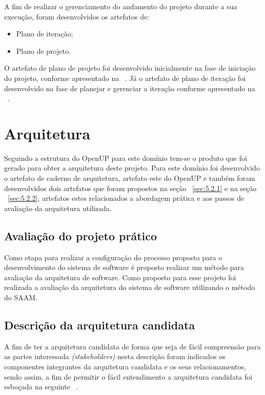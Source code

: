 A fim de realizar o gerenciamento do andamento do projeto durante a sua execução, foram desenvolvidos os artefatos de: 
\begin{itemize}
    \item Plano de iteração;
    \item Plano de projeto.
\end{itemize}

O artefato de plano de projeto foi desenvolvido inicialmente na fase de iniciação do projeto, conforme apresentado na ~. Já o artefato de plano de iteração foi desenvolvido na fase de planejar e gerenciar a iteração conforme apresentado na ~.
\section{Arquitetura}
\label{sec:arquitetura}

Seguindo a estrutura do \acrfull{OpenUP} para este domínio tem-se  o produto que foi gerado para obter a arquitetura deste projeto. Para este domínio foi desenvolvido o artefato de caderno de arquitetura, artefato este do \acrfull{OpenUP} e também foram desenvolvidos dois artefatos que foram propostos na seção ~\ref{sec:5.2.1} e na seção ~\ref{sec:5.2.2}, artefatos estes relacionados a abordagem prática e aos passos de avaliação da arquitetura utilizada.

\subsection{Avaliação do projeto prático}

Como etapa para realizar a configuração do processo proposto para o desenvolvimento do sistema de software é proposto realizar um método para avaliação da arquitetura de software. Como proposto para esse projeto foi realizada a avaliação da arquitetura do sistema de software utilizando o método do \acrfull{SAAM}.

\subsection{Descrição da arquitetura candidata}

A fim de ter a arquitetura candidata de forma que seja de fácil compreensão para as partes interessada \emph{(stakeholders)} nesta descrição foram indicados os componentes integrantes da arquitetura candidata e os seus relacionamentos, sendo assim, a fim de permitir o fácil entendimento a arquitetura candidata foi esboçada na seguinte ~.

